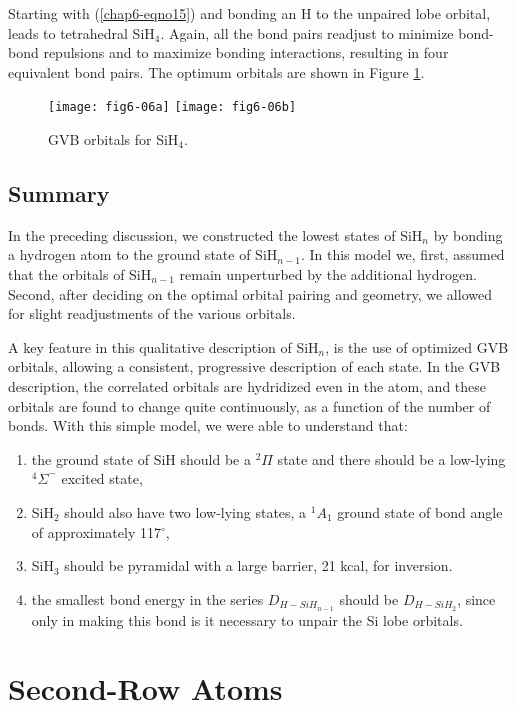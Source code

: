 Starting with (\ref{chap6-eqno15}) and bonding an H to the unpaired
lobe orbital, leads to tetrahedral SiH$_4$.  Again, all the bond pairs
readjust to minimize bond-bond repulsions and to maximize bonding
interactions, resulting in four equivalent bond pairs.  The optimum
orbitals are shown in Figure \ref{chap6-fig6}.

\begin{figure}
\texttt{[image: fig6-06a]}
\texttt{[image: fig6-06b]}
\caption{GVB orbitals for SiH$_4$.}
\label{chap6-fig6}
\end{figure}

\subsection{Summary}

In the preceding discussion, we constructed the lowest states of 
SiH$_n$ by bonding a hydrogen atom to the ground state of 
SiH$_{n-1}$.  In this model we, first, assumed that the orbitals of 
SiH$_{n-1}$ remain unperturbed by the additional hydrogen.  Second, 
after deciding on the optimal orbital pairing and geometry, we allowed 
for slight readjustments of the various orbitals.

A key feature in this qualitative description of SiH$_n$, is the use of 
optimized GVB orbitals, allowing a consistent, 
progressive description of each state.  In the GVB 
description, the correlated orbitals are hydridized even in the atom, 
and these orbitals are found to change quite continuously, as a 
function of the number of bonds.  With this simple model, we were able 
to understand that:
\begin{enumerate}
\item the ground state of SiH should be a 
${^2\Pi}$ state and there should be a low-lying ${^4\Sigma}^-$ 
excited state,  
\item SiH$_2$ should also have two low-lying states, 
a ${^1A}_1$ ground state of bond angle of approximately 
117$^{\circ}$, 
\item SiH$_3$ should be pyramidal with a large 
barrier, 21 kcal, for inversion.
\item the smallest bond energy 
in the series $D_{H-SiH_{n-1}}$ should be $D_{H-SiH_2}$, since only in 
making this bond is it necessary to unpair the Si lobe orbitals.
\end{enumerate}

\section{Second-Row Atoms}

